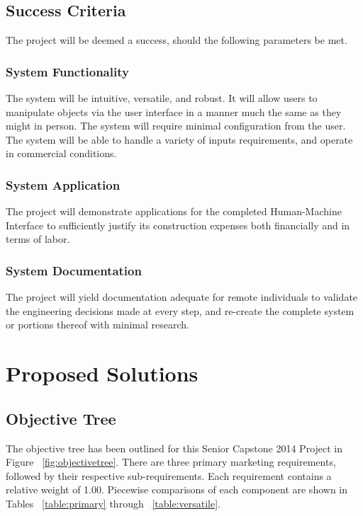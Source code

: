 \documentclass[11pt]{report}
\begin{document}
\section{Success Criteria}
The project will be deemed a success, should the following parameters be met.

\subsection{System Functionality}
The system will be intuitive, versatile, and robust.
It will allow users to manipulate objects via the user interface in a manner much the same as they might in person.
The system will require minimal configuration from the user.
The system will be able to handle a variety of inputs requirements, and operate in commercial conditions.

\subsection{System Application}
The project will demonstrate applications for the completed Human-Machine Interface to sufficiently justify its construction expenses both financially and in terms of labor.

\subsection{System Documentation}
The project will yield documentation adequate for remote individuals to validate the engineering decisions made at every step, and re-create the complete system or portions thereof with minimal research.

\chapter{Proposed Solutions}
\section{Objective Tree}
The objective tree has been outlined for this Senior Capstone 2014 Project in Figure ~\ref{fig:objectivetree}.
There are three primary marketing requirements, followed by their respective sub-requirements. Each requirement contains a relative weight of 1.00.
Piecewise comparisons of each component are shown in Tables ~\ref{table:primary} through ~\ref{table:versatile}.
\end{document}

